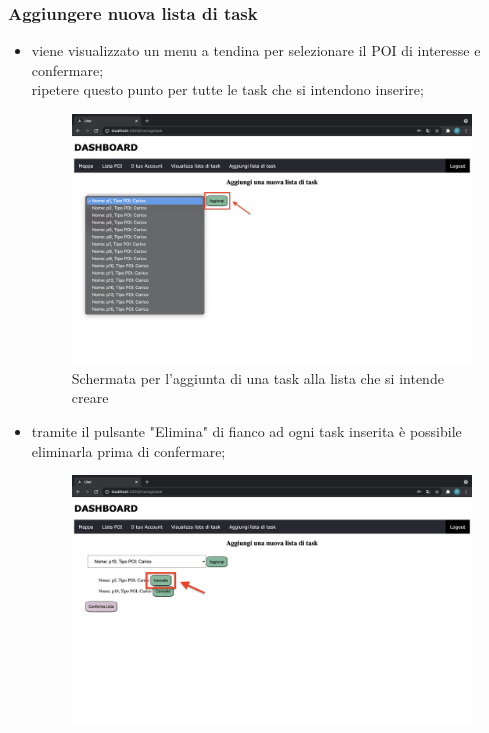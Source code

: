 \begin{itemize}
\subsubsection{Aggiungere nuova lista di task}
\begin{itemize}
 \item viene visualizzato un menu a tendina per selezionare  il POI di interesse e confermare; \\ripetere questo punto per tutte le task che si intendono inserire;
    \begin{figure}[H]
        \centering
        \includegraphics[scale=0.2]{res/images/aggiungitask.png}
        \caption{Schermata per l'aggiunta di una task alla lista che si intende creare}
    \end{figure}
    \item tramite il pulsante "Elimina" di fianco ad ogni task inserita è possibile eliminarla prima di confermare;
    \begin{figure}[H]
        \centering
        \includegraphics[scale=0.2]{res/images/eliminatask.png}

\end{figure}
\end{itemize}
\end{itemize}
